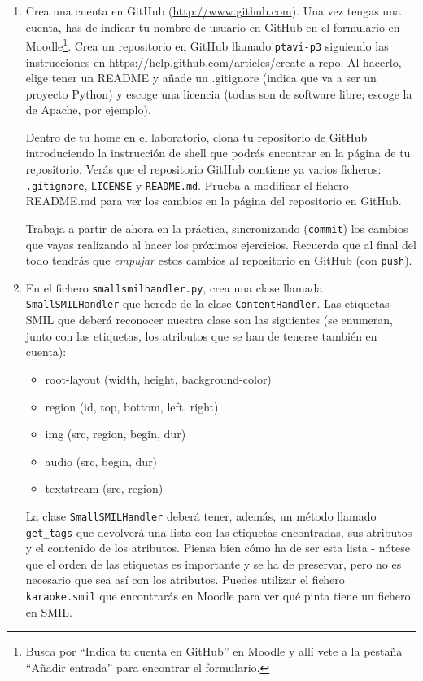 \documentclass[11pt,a4paper]{article}
\newcommand{\finejercicio}{
  \begin{footnotesize}
    [Al terminar el ejercicio es recomendable hacer \texttt{commit} de los ficheros modificados]
  \end{footnotesize}
}
\begin{document}
\begin{enumerate}

  \item Crea una cuenta en GitHub (\url{http://www.github.com}). Una vez tengas una cuenta, has de indicar tu nombre de usuario en GitHub en el formulario en Moodle\footnote{Busca por ``Indica tu cuenta en GitHub'' en Moodle y allí vete a la pestaña ``Añadir entrada'' para encontrar el formulario.}. Crea un repositorio en GitHub llamado \texttt{ptavi-p3} siguiendo las instrucciones en \url{https://help.github.com/articles/create-a-repo}. Al hacerlo, elige tener un README y añade un .gitignore (indica que va a ser un proyecto Python) y escoge una licencia (todas son de software libre; escoge la de Apache, por ejemplo).

  Dentro de tu home en el laboratorio, clona tu repositorio de GitHub introduciendo la instrucción de shell que podrás encontrar en la página de tu repositorio. Verás que el repositorio GitHub contiene ya varios ficheros: \texttt{.gitignore}, \texttt{LICENSE}
y \texttt{README.md}. Prueba a modificar el fichero README.md para ver los cambios en la página del repositorio en GitHub.

  Trabaja a partir de ahora en la práctica, sincronizando (\texttt{commit}) los cambios que vayas realizando al hacer los próximos ejercicios. Recuerda que al final del todo tendrás que \emph{empujar} estos cambios al repositorio en GitHub (con \texttt{push}).


  \item En el fichero \texttt{smallsmilhandler.py}, crea una clase llamada \texttt{SmallSMILHandler} que herede de la clase \texttt{ContentHandler}. Las etiquetas SMIL que deberá reconocer nuestra clase son las siguientes (se enumeran, junto con las etiquetas, los atributos que se han de tenerse también en cuenta):
  \begin{itemize}
    \item root-layout (width, height, background-color)
    \item region (id, top, bottom, left, right)
    \item img (src, region, begin, dur)
    \item audio (src, begin, dur)
    \item textstream (src, region)
  \end{itemize}
	La clase \texttt{SmallSMILHandler} deberá tener, además, un método llamado \texttt{get\_tags} que devolverá una lista con las etiquetas encontradas, sus atributos y el contenido de los atributos. Piensa bien cómo ha de ser esta lista  - nótese que el orden de las etiquetas es importante y se ha de preservar, pero no es necesario que sea así con los atributos. Puedes utilizar el fichero \texttt{karaoke.smil} que encontrarás en Moodle para ver qué pinta tiene un fichero en SMIL.


\end{enumerate}
\end{document}
